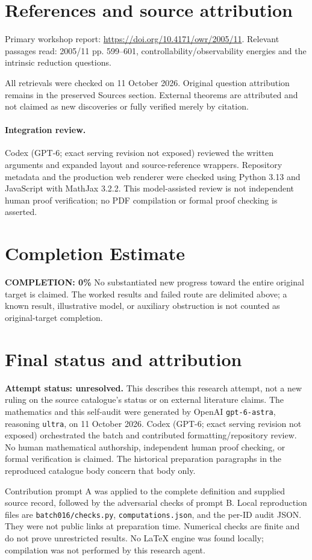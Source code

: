 \documentclass[11pt]{article}
\begin{document}
\section{References and source attribution}
Primary workshop report: \url{https://doi.org/10.4171/owr/2005/11}. Relevant passages read: 2005/11 pp. 599--601, controllability/observability energies and the intrinsic reduction questions.

All retrievals were checked on 11 October 2026. Original question attribution remains in the preserved Sources section. External theorems are attributed and not claimed as new discoveries or fully verified merely by citation.


\paragraph{Integration review.} Codex (GPT-6; exact serving revision not exposed) reviewed the written arguments and expanded layout and source-reference wrappers. Repository metadata and the production web renderer were checked using Python 3.13 and JavaScript with MathJax 3.2.2. This model-assisted review is not independent human proof verification; no PDF compilation or formal proof checking is asserted.

\section{Completion Estimate}
\noindent\textbf{COMPLETION: 0\%}
No substantiated new progress toward the entire original target is claimed. The worked results and failed route are delimited above; a known result, illustrative model, or auxiliary obstruction is not counted as original-target completion.

\section{Final status and attribution}
\textbf{Attempt status: unresolved.} This describes this research attempt, not a new ruling on the source catalogue's status or on external literature claims.
The mathematics and this self-audit were generated by OpenAI \texttt{gpt-6-astra}, reasoning \texttt{ultra}, on 11 October 2026. Codex (GPT-6; exact serving revision not exposed) orchestrated the batch and contributed formatting/repository review. No human mathematical authorship, independent human proof checking, or formal verification is claimed. The historical preparation paragraphs in the reproduced catalogue body concern that body only.

Contribution prompt A was applied to the complete definition and supplied source record, followed by the adversarial checks of prompt B. Local reproduction files are \texttt{batch016/checks.py}, \texttt{computations.json}, and the per-ID audit JSON. They were not public links at preparation time. Numerical checks are finite and do not prove unrestricted results. No LaTeX engine was found locally; compilation was not performed by this research agent.
\end{document}
